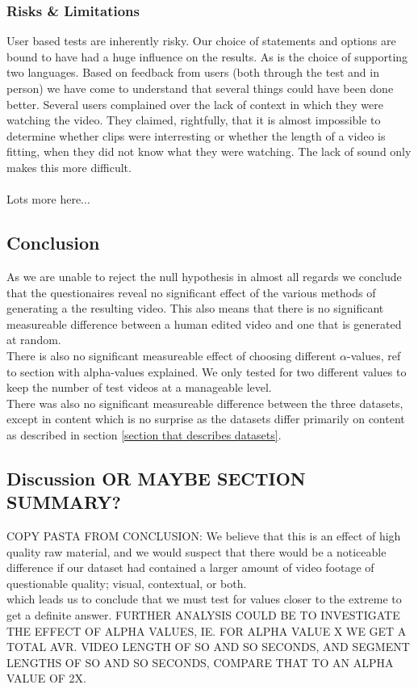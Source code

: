 \subsubsection{Risks \& Limitations}
%
User based tests are inherently risky. Our choice of statements and options are bound to have had a huge influence on the results. As is the choice of supporting two languages. Based on feedback from users (both through the test and in person) we have come to understand that several things could have been done better. Several users complained over the lack of context in which they were watching the video. They claimed, rightfully, that it is almost impossible to determine whether clips were interresting or whether the length of a video is fitting, when they did not know what they were watching. The lack of sound only makes this more difficult.\\\\
%
Lots more here...
%
\subsection{Conclusion}
%
As we are unable to reject the null hypothesis in almost all regards we conclude that the questionaires reveal no significant effect of the various methods of generating a the resulting video. This also means that there is no significant measureable difference between a human edited video and one that is generated at random.\\
There is also no significant measureable effect of choosing different $\alpha$-values, ref to section with alpha-values explained. We only tested for two different values to keep the number of test videos at a manageable level.\\
There was also no significant measureable difference between the three datasets, except in content which is no surprise as the datasets differ primarily on content as described in section \ref{section that describes datasets}.
%
\subsection{Discussion OR MAYBE SECTION SUMMARY?}
%
COPY PASTA FROM CONCLUSION:
We believe that this is an effect of high quality raw material, and we would suspect that there would be a noticeable difference if our dataset had contained a larger amount of video footage of questionable quality; visual, contextual, or both.\\
which leads us to conclude that we must test for values closer to the extreme to get a definite answer. FURTHER ANALYSIS COULD BE TO INVESTIGATE THE EFFECT OF ALPHA VALUES, IE. FOR ALPHA VALUE X WE GET A TOTAL AVR. VIDEO LENGTH OF SO AND SO SECONDS, AND SEGMENT LENGTHS OF SO AND SO SECONDS, COMPARE THAT TO AN ALPHA VALUE OF 2X.\\
%